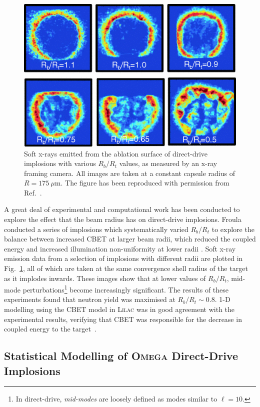 \begin{figure}[t!]
    \includegraphics[width=0.5\linewidth]{Results1/Images/RbRt_froula.png}
    \centering
    \caption{Soft x-rays emitted from the ablation surface of direct-drive implosions with various $R_b/R_t$ values, as measured by an x-ray framing camera.
    All images are taken at a constant capsule radius of $R=175\ \mu\text{m}$.
    The figure has been reproduced with permission from Ref.~\cite{froula_increasing_2012}.}%
    \label{fig:RbRt_froula}
\end{figure}

A great deal of experimental and computational work has been conducted to explore the effect that the beam radius has on direct-drive implosions.
Froula  conducted a series of implosions which systematically varied $R_b/R_t$ to explore the balance between increased \ac{CBET} at larger beam radii, which reduced the coupled energy and increased illumination non-uniformity at lower radii \cite{froula_increasing_2012}.
Soft x-ray emission data from a selection of implosions with different radii are plotted in Fig.~\ref{fig:RbRt_froula}, all of which are taken at the same convergence shell radius of the target as it implodes inwards.
These images show that at lower values of $R_b/R_t$, mid-mode perturbations\footnote{In direct-drive, \textit{mid-modes} are loosely defined as modes similar to $\ell=10$.} become increasingly significant.
The results of these experiments found that neutron yield was maximised at $R_b/R_t\sim 0.8$.
1-D modelling using the \ac{CBET} model in \textsc{Lilac} was in good agreement with the experimental results, verifying that \ac{CBET} was responsible for the decrease in coupled energy to the target~\cite{igumenshchev_crossed-beam_2012}.

\subsection{Statistical Modelling of \textsc{Omega} Direct-Drive Implosions}%
\label{sec:Res1_OMEGA_stat_modelling}

